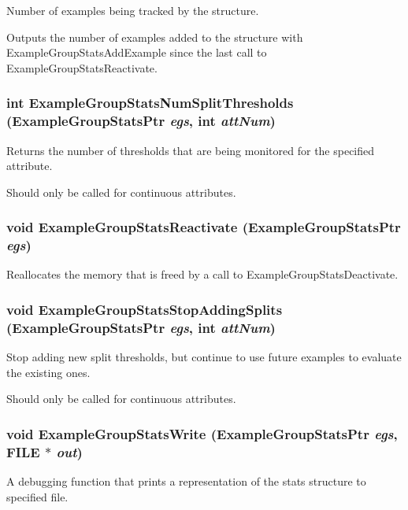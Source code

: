 Number of examples being tracked by the structure. 

Outputs the number of examples added to the structure with Example\-Group\-Stats\-Add\-Example since the last call to Example\-Group\-Stats\-Reactivate. 
\subsubsection{\setlength{\rightskip}{0pt plus 5cm}int Example\-Group\-Stats\-Num\-Split\-Thresholds ({\bf Example\-Group\-Stats\-Ptr} {\em egs}, int {\em att\-Num})}\label{ExampleGroupStats_8h_a54}


Returns the number of thresholds that are being monitored for the specified attribute. 

Should only be called for continuous attributes. 
\subsubsection{\setlength{\rightskip}{0pt plus 5cm}void Example\-Group\-Stats\-Reactivate ({\bf Example\-Group\-Stats\-Ptr} {\em egs})}\label{ExampleGroupStats_8h_a23}


Reallocates the memory that is freed by a call to Example\-Group\-Stats\-Deactivate. 

\subsubsection{\setlength{\rightskip}{0pt plus 5cm}void Example\-Group\-Stats\-Stop\-Adding\-Splits ({\bf Example\-Group\-Stats\-Ptr} {\em egs}, int {\em att\-Num})}\label{ExampleGroupStats_8h_a53}


Stop adding new split thresholds, but continue to use future examples to evaluate the existing ones. 

Should only be called for continuous attributes. 
\subsubsection{\setlength{\rightskip}{0pt plus 5cm}void Example\-Group\-Stats\-Write ({\bf Example\-Group\-Stats\-Ptr} {\em egs}, FILE $\ast$ {\em out})}\label{ExampleGroupStats_8h_a25}


A debugging function that prints a representation of the stats structure to specified file. 

